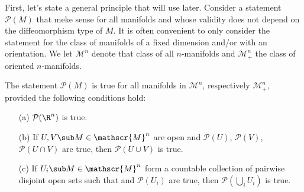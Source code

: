 First, let's state a general principle that will use later. Consider a statement $\mathcal{P}(M)$ that meke sense for all manifolds and whose validity does not depend 
on the diffeomorphism type of $M$. It is often convenient to only consider the statement for the class of manifolds of a fixed dimension and/or with an orientation. We 
let $\mathscr{M}^n$ denote that class of all $n$-manifolds and $\mathscr{M}^n_+$ the class of oriented 
$n$-manifolds.
\begin{theorem}
The statement $\mathcal{P}(M)$ is true for all manifolds in $\mathscr{M}^n$, respectively $\mathscr{M}^n_+$, provided the following conditions hold:
\begin{itemize}
\item[(a)] $\mathcal{P}(\R^n)$ is true.
\item[(b)] If $U,V\sub M\in\mathscr{M}^n$ are open and $\mathcal{P}(U)$, $\mathcal{P}(V)$, $\mathcal{P}(U\cap V)$ are true, then $\mathcal{P}(U\cup V)$ is true.
\item[(c)] If $U_i\sub M\in\mathscr{M}^n$ form a countable collection of pairwise disjoint open sets such that and $\mathcal{P}(U_i)$ are true, then $\mathcal{P}(\bigcup_iU_i)$ 
is true.
\end{itemize}
\end{theorem}
